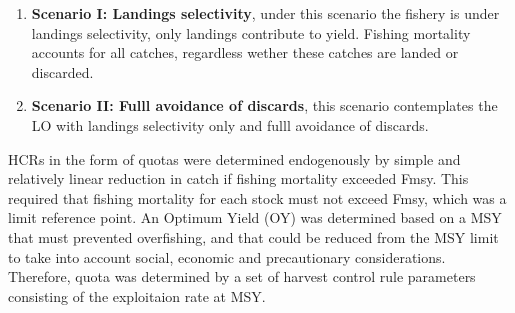\documentclass[12pt,oneline,a4paper,numbib]{ouparticle}
\numberwithin{equation}{subsection} %
\begin{document}
\begin{table}[!h]
\centering
\caption{}
\label{scenarios}
\end{table}
 
\begin{enumerate}

\item
\textbf{Scenario I: Landings selectivity},  under this scenario the fishery is under landings selectivity, only landings contribute to yield. Fishing mortality accounts for all catches, regardless wether these catches are landed or discarded.

\item
\textbf{Scenario II: Fulll avoidance of discards}, this scenario contemplates the LO with landings selectivity only and fulll avoidance of discards.


\end{enumerate}

HCRs in the form of quotas were determined endogenously by simple and relatively linear reduction in catch if fishing mortality exceeded Fmsy. This required that fishing mortality for each stock must not exceed Fmsy, which was a limit reference point. An Optimum Yield (OY) was determined based on a MSY that must prevented overfishing, and that could be reduced from the MSY limit to take into account social, economic and precautionary considerations.  Therefore, quota was determined by a set of harvest control rule parameters consisting of the exploitaion rate at MSY.
\end{document}
